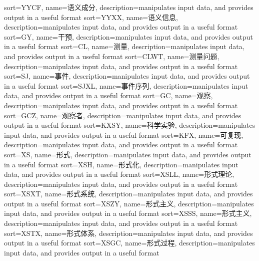 {
  sort=YYCF,
  name=语义成分,
  description={manipulates input data, and provides output in a useful format}
}
{
  sort=YYXX,
  name=语义信息,
  description={manipulates input data, and provides output in a useful format}
}
{
  sort=GY,
  name=干预,
  description={manipulates input data, and provides output in a useful format}
}
{
  sort=CL,
  name=测量,
  description={manipulates input data, and provides output in a useful format}
}
{
  sort=CLWT,
  name=测量问题,
  description={manipulates input data, and provides output in a useful format}
}
{
  sort=SJ,
  name=事件,
  description={manipulates input data, and provides output in a useful format}
}
{
  sort=SJXL,
  name=事件序列,
  description={manipulates input data, and provides output in a useful format}
}
{
  sort=GC,
  name=观察,
  description={manipulates input data, and provides output in a useful format}
}
{
  sort=GCZ,
  name=观察者,
  description={manipulates input data, and provides output in a useful format}
}
{
  sort=KXSY,
  name=科学实验,
  description={manipulates input data, and provides output in a useful format}
}
{
  sort=KFX,
  name=可复现,
  description={manipulates input data, and provides output in a useful format}
}
{
  sort=XS,
  name=形式,
  description={manipulates input data, and provides output in a useful format}
}
{
  sort=XSH,
  name=形式化,
  description={manipulates input data, and provides output in a useful format}
}
{
  sort=XSLL,
  name=形式理论,
  description={manipulates input data, and provides output in a useful format}
}
{
  sort=XSXT,
  name=形式系统,
  description={manipulates input data, and provides output in a useful format}
}
{
  sort=XSZY,
  name=形式主义,
  description={manipulates input data, and provides output in a useful format}
}
{
  sort=XSSS,
  name=形式主义,
  description={manipulates input data, and provides output in a useful format}
}
{
  sort=XSTX,
  name=形式体系,
  description={manipulates input data, and provides output in a useful format}
}
{
  sort=XSGC,
  name=形式过程,
  description={manipulates input data, and provides output in a useful format}
}
